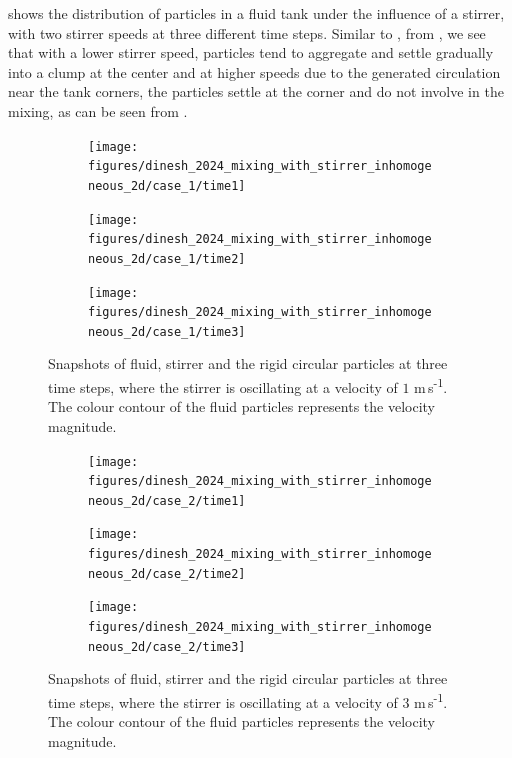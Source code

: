 \documentclass[preprint,12pt]{elsarticle}
\begin{document}
 shows the distribution of particles in a
fluid tank under the influence of a stirrer, with two stirrer speeds at three
different time steps. Similar to
, from
, we see that with a lower stirrer speed, particles tend
to aggregate and settle gradually into a clump at the center and at higher
speeds due to the generated circulation near the tank corners, the particles
settle at the corner and do not involve in the mixing, as can be seen from
.
\begin{figure}[!htpb]
  \centering
  \begin{subfigure}{0.48\textwidth}
    \centering
    \texttt{[image: figures/dinesh\_2024\_mixing\_with\_stirrer\_inhomogeneous\_2d/case\_1/time1]}
    \label{fig:1-mixing-1-b}
  \end{subfigure}
  \begin{subfigure}{0.48\textwidth}
    \centering
    \texttt{[image: figures/dinesh\_2024\_mixing\_with\_stirrer\_inhomogeneous\_2d/case\_1/time2]}
    \label{fig:1-mixing-1-c}
  \end{subfigure}

  \begin{subfigure}{0.48\textwidth}
    \centering
    \texttt{[image: figures/dinesh\_2024\_mixing\_with\_stirrer\_inhomogeneous\_2d/case\_1/time3]}
    \label{fig:1-mixing-1-d}
  \end{subfigure}
  \caption{Snapshots of fluid, stirrer and the rigid circular particles at
    three time steps, where the stirrer is oscillating at a velocity of $1$
    m\,s\textsuperscript{-1}. The colour contour of the fluid particles
    represents the velocity magnitude.}
\label{fig:2-mixing-1}
\end{figure}
\begin{figure}[!htpb]
  \centering
  \begin{subfigure}{0.48\textwidth}
    \centering
    \texttt{[image: figures/dinesh\_2024\_mixing\_with\_stirrer\_inhomogeneous\_2d/case\_2/time1]}
    \label{fig:1-mixing-1-b}
  \end{subfigure}
  \begin{subfigure}{0.48\textwidth}
    \centering
    \texttt{[image: figures/dinesh\_2024\_mixing\_with\_stirrer\_inhomogeneous\_2d/case\_2/time2]}
    \label{fig:1-mixing-1-c}
  \end{subfigure}

  \begin{subfigure}{0.48\textwidth}
    \centering
    \texttt{[image: figures/dinesh\_2024\_mixing\_with\_stirrer\_inhomogeneous\_2d/case\_2/time3]}
    \label{fig:1-mixing-1-d}
  \end{subfigure}
  \caption{Snapshots of fluid, stirrer and the rigid circular particles at
    three time steps, where the stirrer is oscillating at a velocity of $3$
    m\,s\textsuperscript{-1}. The colour contour of the fluid particles
    represents the velocity magnitude.}
\label{fig:2-mixing-2}
\end{figure}
\end{document}
